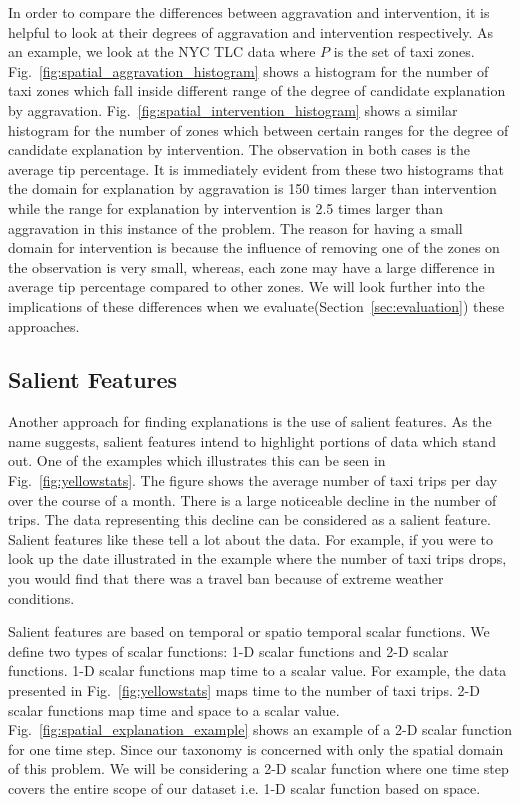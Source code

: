 In order to compare the differences between aggravation and intervention, it is helpful to look at their degrees of aggravation and intervention respectively. As an example, we look at the NYC TLC data where $P$ is the set of taxi zones. Fig.~\ref{fig:spatial_aggravation_histogram} shows a histogram for the number of taxi zones which fall inside different range of the degree of candidate explanation by aggravation. Fig.~\ref{fig:spatial_intervention_histogram} shows a similar histogram for the number of zones which between certain ranges for the degree of candidate explanation by intervention. The observation in both cases is the average tip percentage. It is immediately evident from these two histograms that the domain for explanation by aggravation is 150 times larger than intervention while the range for explanation by intervention is 2.5 times larger than aggravation in this instance of the problem. The reason for having a small domain for intervention is because the influence of removing one of the zones on the observation is very small, whereas, each zone may have a large difference in average tip percentage compared to other zones. We will look further into the implications of these differences when we evaluate(Section~\ref{sec:evaluation}) these approaches.

\subsection{Salient Features}
\label{sec:salient_features}

Another approach for finding explanations is the use of salient features. As the name suggests, salient features intend to highlight portions of data which stand out. One of the examples which illustrates this can be seen in Fig.~\ref{fig:yellowstats}. The figure shows the average number of taxi trips per day over the course of a month. There is a large noticeable decline in the number of trips. The data representing this decline can be considered as a salient feature. Salient features like these tell a lot about the data. For example, if you were to look up the date illustrated in the example where the number of taxi trips drops, you would find that there was a travel ban because of extreme weather conditions.

Salient features are based on temporal or spatio temporal scalar functions. We define two types of scalar functions: 1-D scalar functions and 2-D scalar functions. 1-D scalar functions map time to a scalar value. For example, the data presented in Fig.~\ref{fig:yellowstats} maps time to the number of taxi trips. 2-D scalar functions map time and space to a scalar value.  Fig.~\ref{fig:spatial_explanation_example} shows an example of a 2-D scalar function for one time step. Since our taxonomy is concerned with only the spatial domain of this problem. We will be considering a 2-D scalar function where one time step covers the entire scope of our dataset i.e. 1-D scalar function based on space.

